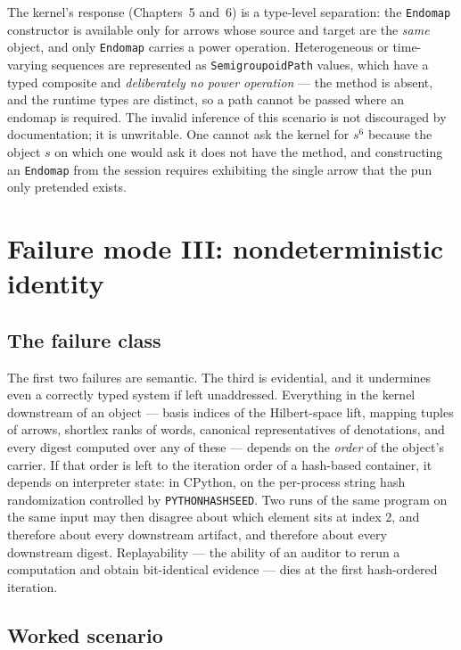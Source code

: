 The kernel's response (Chapters~5 and~6) is a type-level separation: the
\texttt{Endomap} constructor is available only for arrows whose source and
target are the \emph{same} object, and only \texttt{Endomap} carries a power
operation. Heterogeneous or time-varying sequences are represented as
\texttt{SemigroupoidPath} values, which have a typed composite and
\emph{deliberately no power operation} --- the method is absent, and the
runtime types are distinct, so a path cannot be passed where an endomap is
required. The invalid inference of this scenario is not discouraged by
documentation; it is unwritable. One cannot ask the kernel for $s^{6}$
because the object $s$ on which one would ask it does not have the method,
and constructing an \texttt{Endomap} from the session requires exhibiting the
single arrow that the pun only pretended exists.

\section{Failure mode III: nondeterministic identity}\label{ch01:sec:nondet}

\subsection{The failure class}

The first two failures are semantic. The third is evidential, and it
undermines even a correctly typed system if left unaddressed. Everything in
the kernel downstream of an object --- basis indices of the Hilbert-space
lift, mapping tuples of arrows, shortlex ranks of words, canonical
representatives of denotations, and every digest computed over any of these
--- depends on the \emph{order} of the object's carrier. If that order is
left to the iteration order of a hash-based container, it depends on
interpreter state: in CPython, on the per-process string hash randomization
controlled by \texttt{PYTHONHASHSEED}. Two runs of the same program on the
same input may then disagree about which element sits at index $2$, and
therefore about every downstream artifact, and therefore about every
downstream digest. Replayability --- the ability of an auditor to rerun a
computation and obtain bit-identical evidence --- dies at the first
hash-ordered iteration.

\subsection{Worked scenario}\label{ch01:sec:nondet-scenario}

